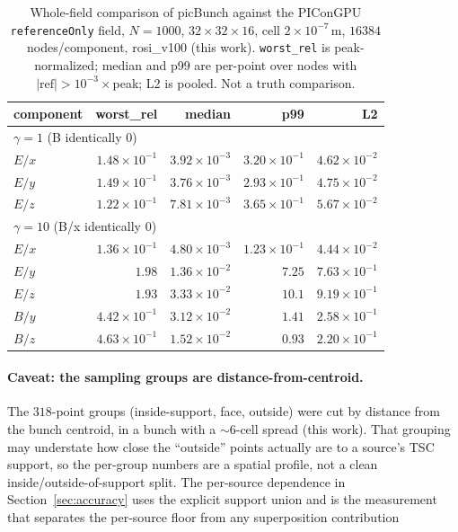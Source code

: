 \begin{table}[t]
\centering
\small
\caption{Whole-field comparison of picBunch against the PIConGPU
\texttt{referenceOnly} field, $N=1000$, $32\times32\times16$, cell
$2\times10^{-7}$\,m,
$16384$ nodes/component, rosi\_v100 (this work). \texttt{worst\_rel} is
peak-normalized; median and p99 are per-point over nodes with
$|\mathrm{ref}|>10^{-3}\times$peak; L2 is pooled. Not a truth comparison.}
\label{tab:wholefield}
\begin{tabular}{lrrrr}
\toprule
component & worst\_rel & median & p99 & L2 \\
\midrule
\multicolumn{5}{l}{\emph{$\gamma=1$} (B identically 0)} \\
$E/x$ & $1.48\times10^{-1}$ & $3.92\times10^{-3}$ & $3.20\times10^{-1}$ & $4.62\times10^{-2}$ \\
$E/y$ & $1.49\times10^{-1}$ & $3.76\times10^{-3}$ & $2.93\times10^{-1}$ & $4.75\times10^{-2}$ \\
$E/z$ & $1.22\times10^{-1}$ & $7.81\times10^{-3}$ & $3.65\times10^{-1}$ & $5.67\times10^{-2}$ \\
\midrule
\multicolumn{5}{l}{\emph{$\gamma=10$} (B/x identically 0)} \\
$E/x$ & $1.36\times10^{-1}$ & $4.80\times10^{-3}$ & $1.23\times10^{-1}$ & $4.44\times10^{-2}$ \\
$E/y$ & $1.98$  & $1.36\times10^{-2}$ & $7.25$ & $7.63\times10^{-1}$ \\
$E/z$ & $1.93$  & $3.33\times10^{-2}$ & $10.1$ & $9.19\times10^{-1}$ \\
$B/y$ & $4.42\times10^{-1}$ & $3.12\times10^{-2}$ & $1.41$ & $2.58\times10^{-1}$ \\
$B/z$ & $4.63\times10^{-1}$ & $1.52\times10^{-2}$ & $0.93$ & $2.20\times10^{-1}$ \\
\bottomrule
\end{tabular}
\end{table}

\paragraph{Caveat: the sampling groups are distance-from-centroid.} The
$318$-point groups (inside-support, face, outside) were cut by distance from
the bunch centroid, in a bunch with a $\sim6$-cell spread (this work). That
grouping may understate how close the ``outside'' points actually are to a
source's TSC support, so the per-group numbers are a spatial profile, not a
clean inside/outside-of-support split. The per-source dependence in
Section~\ref{sec:accuracy} uses the explicit support union and is the
measurement that separates the per-source floor from any superposition
contribution

